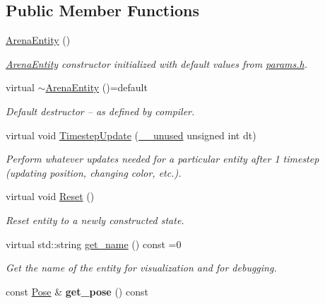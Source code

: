 \subsection*{Public Member Functions}
\begin{DoxyCompactItemize}
\item 
\hyperlink{classArenaEntity_a96df749814e89344a6149e4da89b4e44}{Arena\+Entity} ()\hypertarget{classArenaEntity_a96df749814e89344a6149e4da89b4e44}{}\label{classArenaEntity_a96df749814e89344a6149e4da89b4e44}

\begin{DoxyCompactList}\small\item\em \hyperlink{classArenaEntity}{Arena\+Entity} constructor initialized with default values from \hyperlink{params_8h}{params.\+h}. \end{DoxyCompactList}\item 
virtual \hyperlink{classArenaEntity_aa7af53e5d8830d144ccf2ad07d9140da}{$\sim$\+Arena\+Entity} ()=default\hypertarget{classArenaEntity_aa7af53e5d8830d144ccf2ad07d9140da}{}\label{classArenaEntity_aa7af53e5d8830d144ccf2ad07d9140da}

\begin{DoxyCompactList}\small\item\em Default destructor -- as defined by compiler. \end{DoxyCompactList}\item 
virtual void \hyperlink{classArenaEntity_a203613c40a5cecf47606b2a59adcc3bd}{Timestep\+Update} (\hyperlink{common_8h_a2e3484535ee610c8e19e9859563abe48}{\+\_\+\+\_\+unused} unsigned int dt)
\begin{DoxyCompactList}\small\item\em Perform whatever updates needed for a particular entity after 1 timestep (updating position, changing color, etc.). \end{DoxyCompactList}\item 
virtual void \hyperlink{classArenaEntity_abaebe6c02659e22c08579d49829c5676}{Reset} ()\hypertarget{classArenaEntity_abaebe6c02659e22c08579d49829c5676}{}\label{classArenaEntity_abaebe6c02659e22c08579d49829c5676}

\begin{DoxyCompactList}\small\item\em Reset entity to a newly constructed state. \end{DoxyCompactList}\item 
virtual std\+::string \hyperlink{classArenaEntity_ad43152003033cf01ad86eeff1990b69a}{get\+\_\+name} () const =0
\begin{DoxyCompactList}\small\item\em Get the name of the entity for visualization and for debugging. \end{DoxyCompactList}\item 
const \hyperlink{structPose}{Pose} \& {\bfseries get\+\_\+pose} () const \hypertarget{classArenaEntity_af3cf4d62c4392bf9b34238693a0f4d9c}{}\label{classArenaEntity_af3cf4d62c4392bf9b34238693a0f4d9c}


\end{DoxyCompactItemize}
